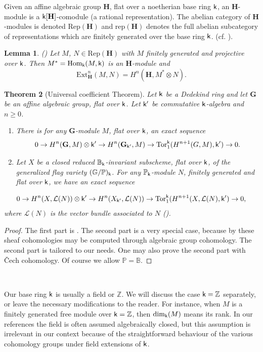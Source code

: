 \documentclass[sn-mathphys-num]{sn-jnl}%
\newcommand{\Ll}{\mathcal L}
\newcommand{\Tor}{\mathrm{Tor}}
\newcommand{\rep}{{\mathrm{rep}}}
\newcommand{\Ext}{{\mathrm{Ext}}}
\newcommand{\Rep}{{\mathrm{Rep}}}
\newcommand*{\Hom}{\mathop{\mathrm {Hom}}\nolimits}
\newcommand{\sk}{{\sf k}}
\newcommand{\Gm}{\mathbb G}
\newcommand{\Bm}{\mathbb B}
\newcommand{\Pp}{\mathbb P}
\newcommand{\Z}{{\mathbb Z}}
\newcommand{\bg}{\mathbf G}
\newcommand{\bh}{\mathbf H}
\newtheorem{theorem}{Theorem}[section]
\newtheorem{lemma}[theorem]{Lemma}
\theoremstyle{definition}
\begin{document}
Given an affine algebraic group $\bh$, flat over a noetherian base ring $\sk$, an $\bh$-module is a $\sk[\bh]$-comodule (a rational representation). 
The abelian category of $\bh$-modules is denoted $\Rep(\bh)$ and $\rep(\bh)$  denotes the full abelian subcategory of representations which are finitely generated over the base ring $\sk$. (cf. \cite[Section 1]{AndChev}).

\begin{lemma}(\cite[I 2.7(4), I 4.2(1), I 4.4]{Jan})
    Let $M$, $N\in \Rep(\bh)$ with $M$
    finitely generated and projective over $\sk$. Then $M^*=\Hom_\sk(M,\sk)$ is an $\bh$-module and 
    $$\Ext^n_\bh(M,N)=H^n(\bh,M^*\otimes N).$$
\end{lemma}


\begin{theorem}[Universal coefficient Theorem]\label{th:universal coefficients}
Let $\sk$ be a Dedekind ring and let $\bg$ be an affine algebraic group, flat over $\sk$. Let $\sk'$ be commutative $\sk$-algebra and $n\geq0$.
\begin{enumerate}
    \item There is for any $\bg$-module $M$, flat over $\sk$, an exact sequence
    $$0\to H^n(\bg,M)\otimes \sk'\to H^n(\bg_{\sk'},M)\to \Tor_1^\sk(H^{n+1}(G,M),\sk')\to 0.$$
    \item Let  $X$ be a closed reduced
    $\Bm_\sk$-invariant subscheme, flat over $\sk$, of the generalized flag variety $(\Gm/\Pp)_\sk$. For any  $\Pp_\sk$-module $N$, finitely generated and flat over $\sk$, we have an exact 
    sequence 
    \end{enumerate}
    $$0\to H^n(X,\Ll(N))\otimes \sk'\to H^n(X_{\sk'},\Ll(N))\to \Tor_1^\sk(H^{n+1}(X,\Ll(N),\sk')\to 0,$$
where $\Ll(N)$ is the vector bundle associated to $N$ 
    (\cite[I 5.8]{Jan}).
\end{theorem}
\begin{proof}
        The first part is \cite[Proposition I 4.18]{Jan}.
        The second part is a very special case,  because by \cite[I 5.8(2)]{Jan} these sheaf cohomologies may be computed through algebraic group cohomology.
        The second part is tailored to
        our needs. One may also prove the second part with \v Cech cohomology.
        Of course we allow $\Pp=\Bm$.
    \end{proof}

    \

    
Our base ring $\sk$ is usually a field or $\Z$. We will discuss the case $\sk=\Z$ separately, or leave the necessary modifications to the reader.
For instance, when $M$ is a finitely generated free module over $\sk=\Z$, then $\dim_\sk(M)$ means its rank. 
In our references the field is often assumed algebraically closed, but this assumption is irrelevant in our context because of
the straightforward behaviour of the various cohomology groups under field extensions of $\sk$.
\end{document}
